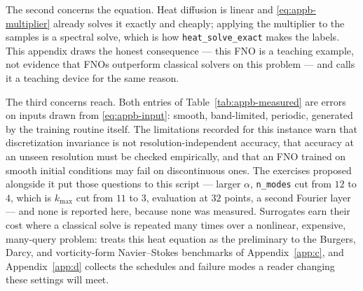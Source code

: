 The second concerns the equation. Heat diffusion is linear and
\eqref{eq:appb-multiplier} already solves it exactly and cheaply; applying the
multiplier to the samples is a spectral solve, which is how \texttt{heat\_solve\_exact}
makes the labels. This appendix draws the honest consequence --- this FNO is a teaching
example, not evidence that FNOs outperform classical solvers on this problem --- and
 calls it a teaching
device for the same reason.

The third concerns reach. Both entries of Table~\ref{tab:appb-measured} are errors on
inputs drawn from \eqref{eq:appb-input}: smooth, band-limited, periodic, generated by
the training routine itself. The limitations recorded for this instance warn that
discretization invariance is not resolution-independent accuracy, that accuracy at an
unseen resolution must be checked empirically, and that an FNO trained on smooth initial
conditions may fail on discontinuous ones. The exercises proposed alongside it put those
questions to this script --- larger $\alpha$, \texttt{n\_modes} cut from $12$ to $4$, which is $k_{\max}$
cut from $11$ to $3$, evaluation at $32$ points, a second Fourier layer --- and none is
reported here, because none was measured. Surrogates earn their cost where a classical
solve is repeated many times
over a nonlinear, expensive, many-query problem:
 treats this heat equation
as the preliminary to the Burgers, Darcy, and vorticity-form Navier--Stokes benchmarks
of Appendix~\ref{app:c}, and Appendix~\ref{app:d} collects the schedules and failure
modes a reader changing these settings will meet.

